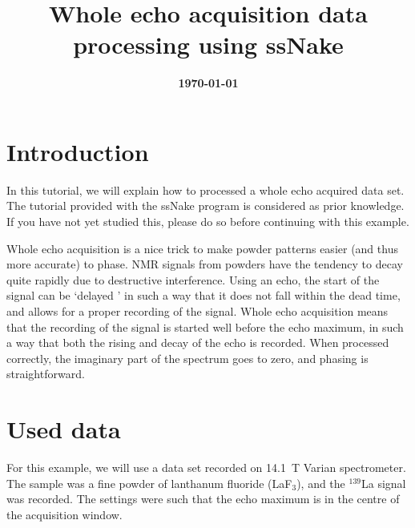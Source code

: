\documentclass[11pt,a4paper]{article}
\title{\color{black}\fontfamily{SourceSansPro-LF}\bfseries Whole echo acquisition data processing using ssNake}
\date{\color{black}\fontfamily{SourceSansPro-LF}\bfseries \today}
\begin{document}


\maketitle

\section{Introduction}
In this tutorial, we will explain how to processed a whole echo acquired data set.
The tutorial provided with the ssNake program is considered as prior knowledge.
If you have not yet studied this, please do so before continuing with this example.

Whole echo acquisition is a nice trick to make powder patterns easier (and thus more accurate) to phase.
NMR signals from powders have the tendency to decay quite rapidly due to destructive interference.
Using an echo, the start of the signal can be `delayed ' in such a way that it does not fall within the dead time, and allows for a proper recording of the signal.
Whole echo acquisition means that the recording of the signal is started well before the echo maximum, in such a way that both the rising and decay of the echo is recorded.
When processed correctly, the imaginary part of the spectrum goes to zero, and phasing is straightforward.

\section{Used data}
For this example, we will use a data set recorded on 14.1~T Varian spectrometer.
The sample was a fine powder of lanthanum fluoride (LaF$_3$), and the $^{139}$La signal was recorded.
The settings were such that the echo maximum is in the centre of the acquisition window.
\end{document}
